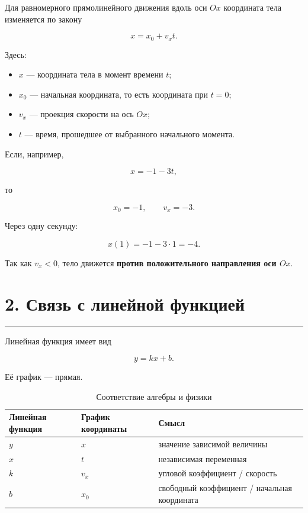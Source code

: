 \documentclass[a4paper,12pt]{article}
\newcommand{\sectionline}{%
  \par\noindent\color{accent}\rule{\linewidth}{0.5pt}\color{textgray}\par
}
\newcommand{\important}[1]{\textbf{\color{darkaccent}#1}}
\begin{document}
Для равномерного прямолинейного движения вдоль оси \(Ox\)
координата тела изменяется по закону

\[
\boxed{x=x_0+v_x t}.
\]

Здесь:

\begin{itemize}[leftmargin=*,itemsep=0.25em]
    \item \(x\) --- координата тела в момент времени \(t\);
    \item \(x_0\) --- начальная координата, то есть координата при \(t=0\);
    \item \(v_x\) --- проекция скорости на ось \(Ox\);
    \item \(t\) --- время, прошедшее от выбранного начального момента.
\end{itemize}

Если, например,

\[
x=-1-3t,
\]

то

\[
x_0=-1,\qquad v_x=-3.
\]

Через одну секунду:

\[
x(1)=-1-3\cdot1=-4.
\]

Так как \(v_x<0\), тело движется \important{против положительного направления оси \(Ox\)}.


\section{\color{darkaccent}2. Связь с линейной функцией}
\sectionline

Линейная функция имеет вид

\[
\boxed{y=kx+b}.
\]

Её график --- прямая.

\begin{table}[h!]
\centering
\caption{Соответствие алгебры и физики}
\renewcommand{\arraystretch}{1.35}
\begin{tabularx}{\linewidth}{@{}XXX@{}}
\toprule
\textbf{Линейная функция} &
\textbf{График координаты} &
\textbf{Смысл} \\
\midrule
\(y\) & \(x\) & значение зависимой величины \\
\(x\) & \(t\) & независимая переменная \\
\(k\) & \(v_x\) & угловой коэффициент / скорость \\
\(b\) & \(x_0\) & свободный коэффициент / начальная координата \\
\bottomrule
\end{tabularx}
\end{table}
\end{document}
